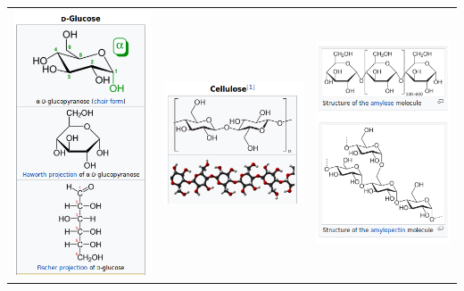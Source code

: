 \documentclass[10pt,a4paper]{article}
\begin{document}
\begin{tabular}{ccc}
\includegraphics[scale=0.5]{Image/Glucose.png}
& 
\includegraphics[scale=0.5]{Image/Cellulose.png}
&
\includegraphics[scale=0.5]{Image/Starch.png} \\  
\end{tabular} 
\end{document}
